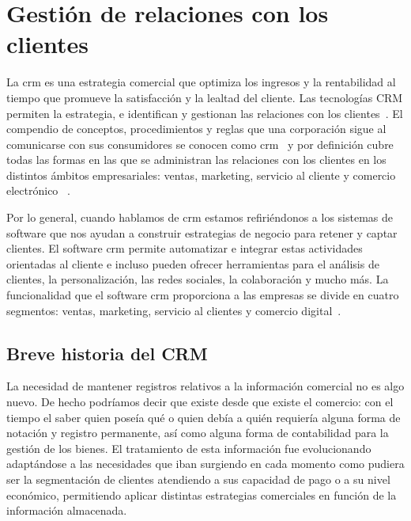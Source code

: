 \section{Gestión de relaciones con los clientes}


La \acrfull{crm} es una estrategia comercial que optimiza los ingresos y la rentabilidad al tiempo que promueve la satisfacción y la lealtad del cliente. Las tecnologías CRM permiten la estrategia, e identifican y gestionan las relaciones con los clientes~\cite{GartnerCRM}. El compendio de conceptos, procedimientos y reglas que una corporación sigue al comunicarse con sus consumidores se conocen como  \acrshort{crm}~\cite{WikiCRM} y por definición cubre todas las formas en las que se administran las relaciones con los clientes en los distintos ámbitos empresariales: ventas, marketing, servicio al cliente y comercio electrónico~\cite{SAP-CRM} . 

Por lo general, cuando hablamos de \acrshort{crm} estamos refiriéndonos a los sistemas de software que nos ayudan a construir estrategias de negocio para retener y captar clientes.
El software \acrfull{crm} permite automatizar e integrar estas actividades orientadas al cliente e incluso pueden ofrecer herramientas para el análisis de clientes, la personalización, las redes sociales, la colaboración y mucho más. La funcionalidad que el software \acrshort{crm} proporciona a las empresas se divide en cuatro segmentos: ventas, marketing, servicio al clientes y comercio digital~\cite{GartnerCRM}. 


\subsection{Breve historia del CRM}

La necesidad de mantener registros relativos a la información comercial no es algo nuevo. De hecho podríamos decir que existe desde que existe el comercio: con el tiempo el saber quien poseía qué o quien debía a quién requiería alguna forma de notación y registro permanente, así como alguna forma de contabilidad para la gestión de los bienes. El tratamiento de esta información fue evolucionando adaptándose a las necesidades que iban surgiendo en cada momento como pudiera ser la segmentación de clientes atendiendo a sus capacidad de pago o a su nivel económico, permitiendo aplicar distintas estrategias comerciales en función de la información almacenada. 


